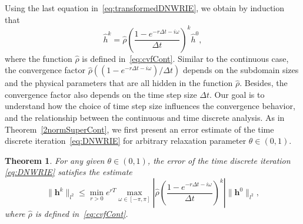 \documentclass[reqno]{amsart}
\newtheorem{theorem}{Theorem}
\begin{document}
Using the last equation in~\eqref{eq:transformedDNWRIE}, we obtain by induction that
\[\widehat h^k = \hat{\rho}\left(\frac{1-e^{-r \Delta t -i \omega}}{\Delta t}\right)^k \widehat h^0,\]
where the function $\hat{\rho}$ is defined in~\eqref{eq:cvfCont}. Similar to the continuous case, the convergence factor $\hat{\rho}((1-e^{-r \Delta t -i \omega})/\Delta t)$ depends on the subdomain sizes and the physical parameters that are all hidden in the function $\hat{\rho}$. Besides, the convergence factor also depends on the time step size $\Delta t$. Our goal is to understand how the choice of time step size influences the convergence behavior, and the relationship between the continuous and time discrete analysis. As in Theorem~\ref{2normSuperCont}, we first present an error estimate of the time discrete iteration~\eqref{eq:DNWRIE}
for arbitrary relaxation parameter $\theta\in(0, 1)$. 

\begin{theorem}\label{superLinearTimeDisc}
For any given $\theta\in(0, 1)$, the error of the time discrete iteration \eqref{eq:DNWRIE} satisfies the estimate 
\begin{equation}\label{eq:GenEstDis}
\|\boldsymbol{h}^k\|_{l^2} \leq \min_{r > 0} e^{rT}\max_{\omega \in [-\pi,\pi]} \left|\hat{\rho}\left(\frac{1-e^{-r \Delta t -i \omega}}{\Delta t}\right)^k\right| \|\boldsymbol{h}^0\|_{l^2},
\end{equation}
where $\hat{\rho}$ is defined in~\eqref{eq:cvfCont}.
\end{theorem}
\end{document}
